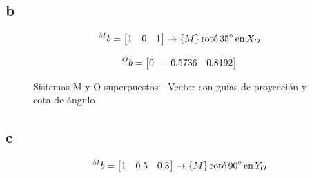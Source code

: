 \documentclass[a4paper,12pt]{article}
\begin{document}
\subsection{b}
\begin{equation*}
    \prescript{M}{}{b} = 
    \begin{bmatrix}
        1 & 0 & 1
    \end{bmatrix}
    \rightarrow \{M\} \, \text{rotó} \,  35^\circ \, \text{en}\, X_O
\end{equation*}

\begin{equation*}
    \prescript{O}{}{b} = 
    \begin{bmatrix}
        0 & -0.5736 & 0.8192
    \end{bmatrix}
\end{equation*}

\begin{figure}[H]
    \centering
    \begin{adjustbox}{scale = 0.85, max width=\columnwidth}
    \end{adjustbox}
    \caption{Sistemas M y O superpuestos - Vector con guías de proyección y cota de ángulo}
\end{figure}

\subsection{c}
\begin{equation*}
    \prescript{M}{}{b} = 
    \begin{bmatrix}
        1 & 0.5 & 0.3
    \end{bmatrix}
    \rightarrow \{M\} \, \text{rotó} \,  90^\circ \, \text{en}\, Y_O
\end{equation*}
\end{document}
